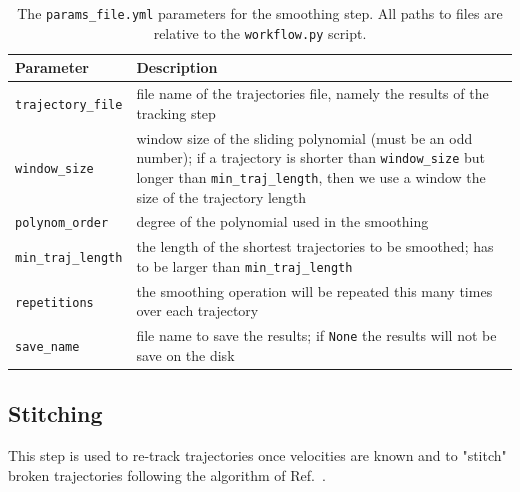 \documentclass[10pt,a4paper]{article}
\begin{document}
\begin{table}[!ht]
	\centering
	\caption{The \texttt{params\_file.yml} parameters for the smoothing step. All paths to files are relative to the \texttt{workflow.py} script.}
	\begin{tabular}{l m{13cm}}
		\hline
		Parameter & Description\\
		\hline
		
		\texttt{trajectory\_file} & file name of the trajectories file, namely the results of the tracking step \\[.5em]
		
		\texttt{window\_size} & window size of the sliding polynomial (must be an odd number); if a trajectory is shorter than \texttt{window\_size} but longer than \texttt{min\_traj\_length}, then we use a window the size of the trajectory length \\[.5em]
		
		\texttt{polynom\_order} & degree of the polynomial used in the smoothing \\[.5em]
		
		\texttt{min\_traj\_length} & the length of the shortest trajectories to be smoothed; has to be larger than \texttt{min\_traj\_length} \\[.5em]
		
		\texttt{repetitions} & the smoothing operation will be repeated this many times over each trajectory \\[.5em]
				
		\texttt{save\_name} & file name to save the results; if \texttt{None} the results will not be save on the disk \\[.5em]
		
		\hline
	\end{tabular}
\end{table}

    
    


\subsection{Stitching}\label{sec:workflow_stitch}

This step is used to re-track trajectories once velocities are known and to "stitch" broken trajectories following the algorithm of Ref.~\cite{Xu2008}.
\end{document}
